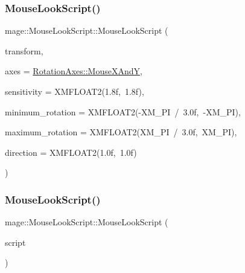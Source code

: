 \subsubsection{\texorpdfstring{Mouse\+Look\+Script()}{MouseLookScript()}\hspace{0.1cm}{\footnotesize\ttfamily [1/3]}}
{\footnotesize\ttfamily mage\+::\+Mouse\+Look\+Script\+::\+Mouse\+Look\+Script (\begin{DoxyParamCaption}\item[{Transform\+Node $\ast$}]{transform,  }\item[{\hyperlink{classmage_1_1_mouse_look_script_af63fd955f796c11e0378813e5d1ab5f8}{Rotation\+Axes}}]{axes = {\ttfamily \hyperlink{classmage_1_1_mouse_look_script_af63fd955f796c11e0378813e5d1ab5f8a109431b32c091e8a7ad541546c66c522}{Rotation\+Axes\+::\+Mouse\+X\+AndY}},  }\item[{const X\+M\+F\+L\+O\+A\+T2 \&}]{sensitivity = {\ttfamily XMFLOAT2(1.8f,~1.8f)},  }\item[{const X\+M\+F\+L\+O\+A\+T2 \&}]{minimum\+\_\+rotation = {\ttfamily XMFLOAT2(-\/XM\+\_\+PI~/~3.0f,~-\/XM\+\_\+PI)},  }\item[{const X\+M\+F\+L\+O\+A\+T2 \&}]{maximum\+\_\+rotation = {\ttfamily XMFLOAT2(XM\+\_\+PI~/~3.0f,~XM\+\_\+PI)},  }\item[{const X\+M\+F\+L\+O\+A\+T2 \&}]{direction = {\ttfamily XMFLOAT2(1.0f,~1.0f)} }\end{DoxyParamCaption})\hspace{0.3cm}{\ttfamily [explicit]}}

\hypertarget{classmage_1_1_mouse_look_script_a54bd09419068ab61c4dd6fda412771d3}{}\label{classmage_1_1_mouse_look_script_a54bd09419068ab61c4dd6fda412771d3} 
\subsubsection{\texorpdfstring{Mouse\+Look\+Script()}{MouseLookScript()}\hspace{0.1cm}{\footnotesize\ttfamily [2/3]}}
{\footnotesize\ttfamily mage\+::\+Mouse\+Look\+Script\+::\+Mouse\+Look\+Script (\begin{DoxyParamCaption}\item[{const \hyperlink{classmage_1_1_mouse_look_script}{Mouse\+Look\+Script} \&}]{script }\end{DoxyParamCaption})\hspace{0.3cm}{\ttfamily [delete]}}

